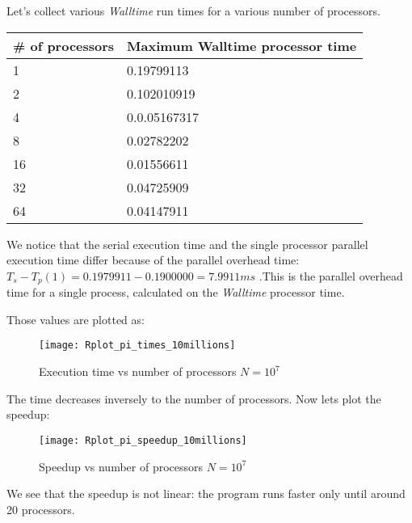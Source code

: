\documentclass[11pt]{scrartcl} %
\begin{document}
Let's collect various \textit{Walltime} run times for a various number of processors. 
\begin{adjustwidth}{2cm}{}
	\begin{tabular}[h]{l|l }
		\hline
			\# of processors&Maximum Walltime processor time\\
			\hline
			1&0.19799113\\
			2&0.102010919\\
			4&0.0.05167317\\
			8&0.02782202\\
			16&0.01556611\\
			32&0.04725909\\
			64&0.04147911\\
		\end{tabular}
	\end{adjustwidth}
We notice that the serial execution time and the single processor parallel execution time differ because of the parallel overhead time: $T_s-T_p(1)= 0.1979911-0.1900000= 7.9911 ms$ .This is the parallel overhead time for a single process, calculated on the \textit{Walltime} processor time.

Those values are plotted as:
\begin{figure}[H] %
	\centering
	\texttt{[image: Rplot\_pi\_times\_10millions]} %
	\caption{Execution time vs number of processors $N = 10^7$ }
\end{figure}

The time decreases inversely to the number of processors. Now lets plot the speedup: 
\begin{figure}[H] %
	\centering
	\texttt{[image: Rplot\_pi\_speedup\_10millions]} %
	\caption{Speedup vs number of processors $N=10^7$}
\end{figure}
We see that the speedup is not linear: the program runs faster only until around 20 processors.
\end{document}
